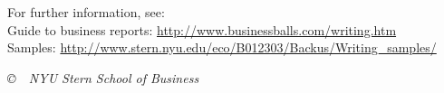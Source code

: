 \documentclass[letterpaper,12pt]{article}
\begin{document}
For further information, see:   \\ 
Guide to business reports:  \url{http://www.businessballs.com/writing.htm} \\
Samples:  \url{http://www.stern.nyu.edu/eco/B012303/Backus/Writing_samples/}


\vfill \centerline{\it \copyright \ \number\year \ NYU Stern
School of Business}
\end{document}
